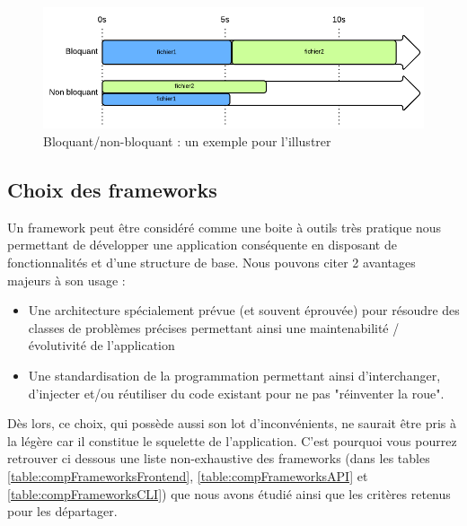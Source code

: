 \begin{figure}[H]
    \includegraphics[width=\textwidth,height=\textheight,keepaspectratio]{images/ComparaisonBloquantOuNon.png}
    \centering
    \caption[Bloquant/non-bloquant : un exemple pour l'illustrer]{Bloquant/non-bloquant : un exemple pour l'illustrer~\cite{NodejsIllustrations}}
    \label{pic:BloquantOrNot}
\end{figure}

\pagebreak

\subsection*{Choix des frameworks}

Un framework peut être considéré comme une boite à outils très pratique nous permettant de développer une application conséquente en disposant de fonctionnalités et d'une structure de base. Nous pouvons citer 2 avantages majeurs à son usage : 
\begin{itemize}
    \item Une architecture spécialement prévue (et souvent éprouvée) pour résoudre des classes de problèmes précises permettant ainsi une maintenabilité / évolutivité  de l'application
    \item Une standardisation de la programmation permettant ainsi d'interchanger, d'injecter et/ou réutiliser du code existant pour ne pas "réinventer la roue".
\end{itemize}
Dès lors, ce choix, qui possède aussi son lot d'inconvénients, ne saurait être pris à la légère car il constitue le squelette de l'application. C'est pourquoi vous pourrez retrouver ci dessous une liste non-exhaustive des frameworks (dans les tables \ref{table:compFrameworksFrontend}, \ref{table:compFrameworksAPI} et \ref{table:compFrameworksCLI}) que nous avons étudié ainsi que les critères retenus pour les départager. \\

